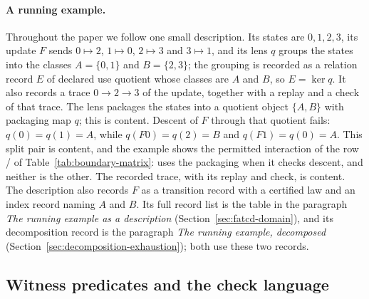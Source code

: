 \paragraph{A running example.} Throughout the paper we follow one small
description. Its states are \(0,1,2,3\), its update \(F\) sends
\(0\mapsto2\), \(1\mapsto0\), \(2\mapsto3\) and \(3\mapsto1\), and its lens
\(q\) groups the states into the classes \(A=\{0,1\}\) and \(B=\{2,3\}\); the
grouping is recorded as a relation record \(E\) of declared use quotient whose
classes are \(A\) and \(B\), so \(E=\ker q\). It
also records a trace \(0\to2\to3\) of the update, together with a replay and a
check of that trace. The lens packages the states into a quotient object
\(\{A,B\}\) with packaging map \(q\); this is \Pfive{} content. Descent of
\(F\) through that quotient fails: \(q(0)=q(1)=A\), while \(q(F0)=q(2)=B\) and
\(q(F1)=q(0)=A\). This split pair is \Pone{} content, and the example shows the
permitted interaction of the row \Pone{}/\Pfive{} of
Table~\ref{tab:boundary-matrix}: \Pone{} uses the \Pfive{} packaging when it
checks descent, and neither is the other. The recorded trace, with its replay
and check, is \Psix{} content. The description also records \(F\) as a
transition record with a certified law and an index record naming \(A\) and
\(B\). Its full record list is the table in the paragraph \emph{The running example as a description} (Section~\ref{sec:fatcd-domain}), and its decomposition record is the paragraph \emph{The running example, decomposed} (Section~\ref{sec:decomposition-exhaustion}); both use these two records.

\subsection*{Witness predicates and the check language}\label{subsec:witness-predicates}
